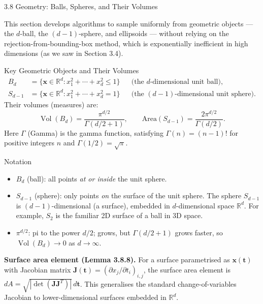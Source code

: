 \documentclass[aspectratio=169,10pt]{beamer}
\newcommand{\RR}{\mathbb{R}}
\DeclareMathOperator{\Vol}{Vol}
\begin{document}
\begin{frame}[allowframebreaks]{3.8 Geometry: Balls, Spheres, and Their Volumes}

This section develops algorithms to sample uniformly from geometric objects ---
the $d$-ball, the $(d-1)$-sphere, and ellipsoids --- without relying on the
rejection-from-bounding-box method, which is exponentially inefficient in high
dimensions (as we saw in Section 3.4).

\begin{block}{Key Geometric Objects and Their Volumes}
  \begin{align*}
    B_d &= \{\mathbf{x} \in \RR^d : x_1^2 + \cdots + x_d^2 \le 1\}
    &&\text{(the $d$-dimensional unit ball)}, \\
    S_{d-1} &= \{\mathbf{x} \in \RR^d : x_1^2 + \cdots + x_d^2 = 1\}
    &&\text{(the $(d-1)$-dimensional unit sphere)}.
  \end{align*}
  Their volumes (measures) are:
  \[
    \Vol(B_d) = \frac{\pi^{d/2}}{\Gamma(d/2+1)}, \qquad
    \mathrm{Area}(S_{d-1}) = \frac{2\pi^{d/2}}{\Gamma(d/2)}.
  \]
  Here $\Gamma$ (Gamma) is the gamma function, satisfying $\Gamma(n) = (n-1)!$
  for positive integers $n$ and $\Gamma(1/2) = \sqrt{\pi}$.
\end{block}

\begin{block}{Notation}
  \begin{itemize}
    \item $B_d$ (ball): all points \emph{at or inside} the unit sphere.
    \item $S_{d-1}$ (sphere): only points \emph{on} the surface of the unit sphere.
      The sphere $S_{d-1}$ is $(d-1)$-dimensional (a surface), embedded in
      $d$-dimensional space $\RR^d$.  For example, $S_2$ is the familiar
      2D surface of a ball in 3D space.
    \item $\pi^{d/2}$: pi to the power $d/2$; grows, but $\Gamma(d/2+1)$ grows
      faster, so $\Vol(B_d) \to 0$ as $d \to \infty$.
  \end{itemize}
\end{block}

\textbf{Surface area element (Lemma 3.8.8).}
For a surface parametrised as $\mathbf{x}(\mathbf{t})$ with Jacobian matrix
$\mathbf{J}(\mathbf{t}) = (\partial x_j/\partial t_i)_{i,j}$,
the surface area element is $dA = \sqrt{|\det(\mathbf{J}\mathbf{J}^T)|}\,d\mathbf{t}$.
This generalises the standard change-of-variables Jacobian to
lower-dimensional surfaces embedded in $\RR^d$.

\end{frame}
\end{document}
